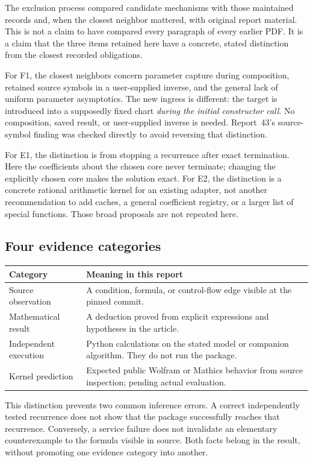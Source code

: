 \documentclass[11pt,letterpaper]{article}
\begin{document}
The exclusion process compared candidate mechanisms with those maintained records and, when the closest neighbor mattered, with original report material. This is not a claim to have compared every paragraph of every earlier PDF. It is a claim that the three items retained here have a concrete, stated distinction from the closest recorded obligations.

For F1, the closest neighbors concern parameter capture during composition, retained source symbols in a user-supplied inverse, and the general lack of uniform parameter asymptotics. The new ingress is different: the target is introduced into a supposedly fixed chart \emph{during the initial constructor call}. No composition, saved result, or user-supplied inverse is needed. Report~43's source-symbol finding was checked directly to avoid reversing that distinction.\cite{register,report43}

For E1, the distinction is from stopping a recurrence after exact termination. Here the coefficients about the chosen core never terminate; changing the explicitly chosen core makes the solution exact. For E2, the distinction is a concrete rational arithmetic kernel for an existing adapter, not another recommendation to add caches, a general coefficient registry, or a larger list of special functions. Those broad proposals are not repeated here.

\subsection{Four evidence categories}
\begin{tabularx}{\textwidth}{@{}>{\raggedright\arraybackslash}p{1.38in}X@{}}
\toprule
Category & Meaning in this report\\
\midrule
Source observation & A condition, formula, or control-flow edge visible at the pinned commit.\\[2pt]
Mathematical result & A deduction proved from explicit expressions and hypotheses in the article.\\[2pt]
Independent execution & Python calculations on the stated model or companion algorithm. They do not run the package.\\[2pt]
Kernel prediction & Expected public Wolfram or Mathics behavior from source inspection; pending actual evaluation.\\
\bottomrule
\end{tabularx}

This distinction prevents two common inference errors. A correct independently tested recurrence does not show that the package successfully reaches that recurrence. Conversely, a service failure does not invalidate an elementary counterexample to the formula visible in source. Both facts belong in the result, without promoting one evidence category into another.
\end{document}
